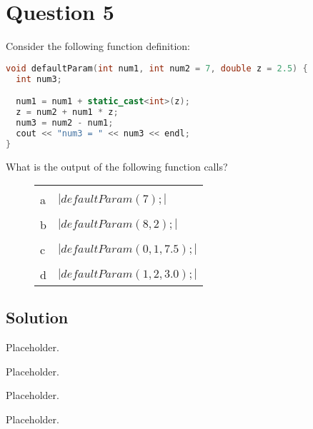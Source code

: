 \documentclass[a4paper, 11pt]{article}
\begin{document}
  \newpage
  \section{Question 5}
    Consider the following function definition:

    \begin{lstlisting}[language=c++,caption={Question 5 Problem}]
void defaultParam(int num1, int num2 = 7, double z = 2.5) {
  int num3;

  num1 = num1 + static_cast<int>(z);
  z = num2 + num1 * z;
  num3 = num2 - num1;
  cout << "num3 = " << num3 << endl;
}
    \end{lstlisting}

    What is the output of the following function calls?

    \begin{figure}[H]
      \centering
      \begin{tabular}{|l|l|}
        \hline\\
        a & $|defaultParam(7);|$\\
        \hline\\
        b & $|defaultParam(8, 2);|$\\
        \hline\\
        c & $|defaultParam(0, 1, 7.5);|$\\
        \hline\\
        d & $|defaultParam(1, 2, 3.0);|$ \\
        \hline
      \end{tabular}
    \end{figure}

    \subsection{Solution}
    \begin{enumerate}[label=\alph*.]
      \begin{minipage}{0.45\textwidth}
        \item \begin{mdframed}[style=AnswerFrame]
          Placeholder.
          \end{mdframed}
        \item \begin{mdframed}[style=AnswerFrame]
          Placeholder.
          \end{mdframed}
      \end{minipage}\hfill
      \begin{minipage}{.45\textwidth}
        \item \begin{mdframed}[style=AnswerFrame]
          Placeholder.
          \end{mdframed}
        \item \begin{mdframed}[style=AnswerFrame]
          Placeholder.
          \end{mdframed}
      \end{minipage}
    \end{enumerate}


  \newpage
  \nocite{textbook}
  \printbibliography[%
    heading=bibintoc,%
    title={Works Consulted}%
  ]{}
  
\end{document}
